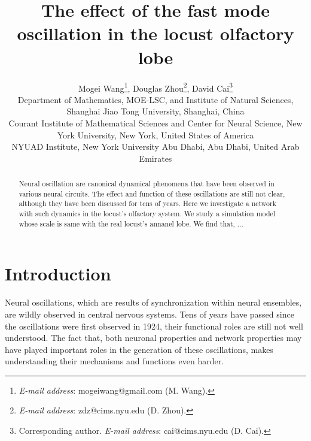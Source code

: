 \documentclass[12pt, a4paper]{article}
\begin{document}
\newcommand{\lr}[1]{\langle #1 \rangle}
\newcommand{\llr}[1]{\langle \hspace{-2.5pt} \langle #1 \rangle \hspace{-2.5pt} \rangle}

\title{The effect of the fast mode oscillation in the locust olfactory lobe}
\author{
Mogei Wang\footnote{\emph{E-mail address}: mogeiwang@gmail.com (M. Wang).},
Douglas Zhou\footnote{\emph{E-mail address}: zdz@cims.nyu.edu (D. Zhou).},
David Cai\footnote{Corresponding author. \emph{E-mail address}: cai@cims.nyu.edu (D. Cai).}
\\{\tiny{
    Department of Mathematics, MOE-LSC, and Institute of Natural Sciences, Shanghai Jiao Tong University, Shanghai, China}} \vspace{-3mm} \\{\tiny{
    Courant Institute of Mathematical Sciences and Center for Neural Science, New York University, New York, United States of America}} \vspace{-3mm} \\{\tiny{
    NYUAD Institute, New York University Abu Dhabi, Abu Dhabi, United Arab Emirates
}} }

\date{} \maketitle \vspace{-10mm}

\begin{abstract} \footnotesize
Neural oscillation are canonical dynamical phenomena that have been observed in various neural circuits. The effect and function of these oscillations are still not clear, although they have been discussed for tens of years. Here we investigate a network with such dynamics in the locust's olfactory system. We study a simulation model whose scale is same with the real locust's annanel lobe. We find that, ...
\end{abstract}

\section{Introduction}
Neural oscillations, which are results of synchronization within neural ensembles, are wildly observed in central nervous systems. Tens of years have passed since the oscillations were first observed in 1924, their functional roles are still not well understood. The fact that, both neuronal properties and network properties may have played important roles in the generation of these oscillations, makes understanding their mechanisms and functions even harder. %
\end{document}
